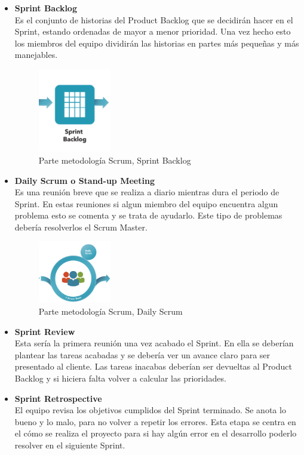 \begin{itemize}
\item \textbf{Sprint Backlog}\\
Es el conjunto de historias del Product Backlog que se decidirán hacer en el Sprint, estando ordenadas de mayor a menor prioridad. Una vez hecho esto los miembros del equipo dividirán las historias en partes más pequeñas y más manejables.

\begin{figure}[H]
		\centering
		\includegraphics[width=0.3\textwidth] {sprint.png}
		\caption{Parte metodología Scrum, Sprint Backlog }\label{fig:sprint}
	\end{figure} 

 
 
\item \textbf{Daily Scrum o Stand-up Meeting}\\
Es una reunión breve que se realiza a diario mientras dura el periodo de Sprint. 
En estas reuniones si algun miembro del equipo encuentra algun problema esto se comenta y se trata de ayudarlo. Este tipo de problemas debería resolverlos el Scrum Master.

\begin{figure}[H]
		\centering
		\includegraphics[width=0.3\textwidth] {daily.png}
		\caption{Parte metodología Scrum, Daily Scrum }\label{fig:daily}
	\end{figure} 

\item\textbf{ Sprint Review}\\
Esta sería la primera reunión una vez acabado el Sprint. En ella se deberían plantear las tareas acabadas y se debería ver un avance claro para ser presentado al cliente. Las tareas inacabas deberían ser devueltas al Product Backlog y si hiciera falta volver a calcular las prioridades.

 \item \textbf{Sprint Retrospective}\\
  El equipo revisa los objetivos cumplidos del Sprint terminado. Se anota lo bueno y lo malo, para no volver a repetir los errores. Esta etapa se centra en el cómo se realiza el proyecto para si hay algún error en el desarrollo poderlo resolver en el siguiente Sprint.
\end{itemize}



